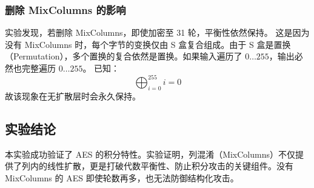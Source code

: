 \documentclass[12pt,a4paper]{article}
\begin{document}
\subsubsection{删除 MixColumns 的影响}
实验发现，若删除 MixColumns，即使加密至 31 轮，平衡性依然保持。
这是因为没有 MixColumns 时，每个字节的变换仅由 S 盒复合组成。由于 S 盒是置换（Permutation），多个置换的复合依然是置换。如果输入遍历了 $0 \dots 255$，输出必然也完整遍历 $0 \dots 255$。
已知：
\begin{equation}
    \bigoplus_{i=0}^{255} i = 0
\end{equation}
故该现象在无扩散层时会永久保持。

\subsection{实验结论}
本实验成功验证了 AES 的积分特性。实验证明，列混淆（MixColumns）不仅提供了列内的线性扩散，更是打破代数平衡性、防止积分攻击的关键组件。没有 MixColumns 的 AES 即使轮数再多，也无法防御结构化攻击。
\appendix
\end{document}
